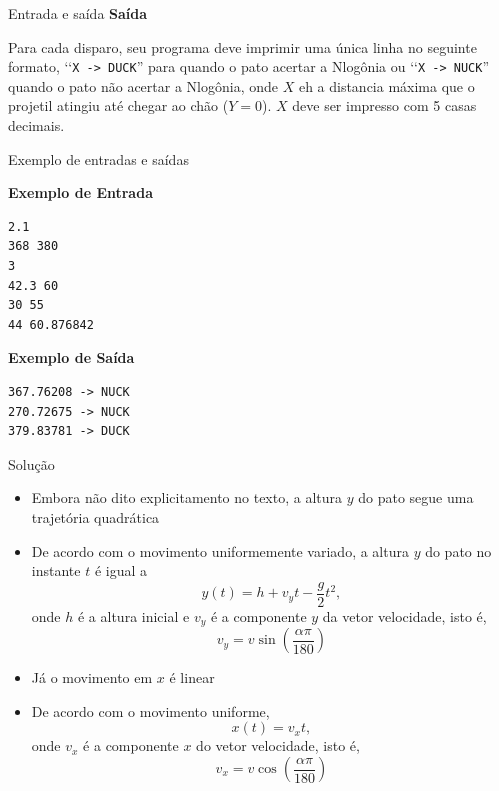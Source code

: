 \begin{frame}[fragile]{Entrada e saída}
\textbf{Saída}

Para cada disparo, seu programa deve imprimir uma única linha no seguinte formato, \lq\lq\texttt{X -> DUCK}” para quando o pato acertar a Nlogônia ou \lq\lq\texttt{X -> NUCK}” quando o pato não acertar a Nlogônia, onde $X$ eh a distancia máxima que o projetil atingiu até chegar ao chão ($Y=0$). $X$ deve ser impresso com 5 casas decimais.

\end{frame}

\begin{frame}[fragile]{Exemplo de entradas e saídas}

\begin{minipage}[t]{0.5\textwidth}
\textbf{Exemplo de Entrada}
\begin{verbatim}
2.1
368 380
3
42.3 60
30 55
44 60.876842
\end{verbatim}
\end{minipage}
\begin{minipage}[t]{0.45\textwidth}
\textbf{Exemplo de Saída}
\begin{verbatim}
367.76208 -> NUCK
270.72675 -> NUCK
379.83781 -> DUCK
\end{verbatim}
\end{minipage}
\end{frame}

\begin{frame}[fragile]{Solução}

    \begin{itemize}
        \item Embora não dito explicitamento no texto, a altura $y$ do pato segue uma trajetória
            quadrática

        \item De acordo com o movimento uniformemente variado, a altura $y$ do pato no instante
            $t$ é igual a
        \[
            y(t) = h + v_yt - \frac{g}{2}{t^2},
        \] onde $h$ é a altura inicial e $v_y$ é a componente $y$ da vetor velocidade, isto é,
        \[
            v_y = v\sin\left(\frac{\alpha\pi}{180}\right)
        \]

        \item Já o movimento em $x$ é linear

        \item De acordo com o movimento uniforme,
        \[
            x(t) = v_xt,
        \] onde $v_x$ é a componente $x$ do vetor velocidade, isto é,
        \[
            v_x = v\cos\left(\frac{\alpha\pi}{180}\right)
        \]

    \end{itemize}

\end{frame}

